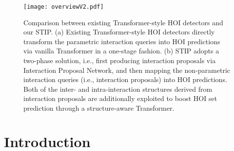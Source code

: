 \documentclass[10pt,twocolumn,letterpaper]{article}
\begin{document}
\begin{figure}
\vspace{-0.4in}
\begin{center}
   \texttt{[image: overviewV2.pdf]}
\end{center}
\vspace{-0.3in}
   \caption{Comparison between existing Transformer-style HOI detectors and our STIP. (a) Existing Transformer-style HOI detectors directly transform the parametric interaction queries into HOI predictions via vanilla Transformer in a one-stage fashion. (b) STIP adopts a two-phase solution, i.e., first producing interaction proposals via Interaction Proposal Network, and then mapping the non-parametric interaction queries (i.e., interaction proposals) into HOI predictions. Both of the inter- and intra-interaction structures derived from interaction proposals are additionally exploited to boost HOI set prediction through a structure-aware Transformer.}
\label{fig:overview}
\vspace{-0.3in}
\end{figure}


\section{Introduction}
\end{document}

